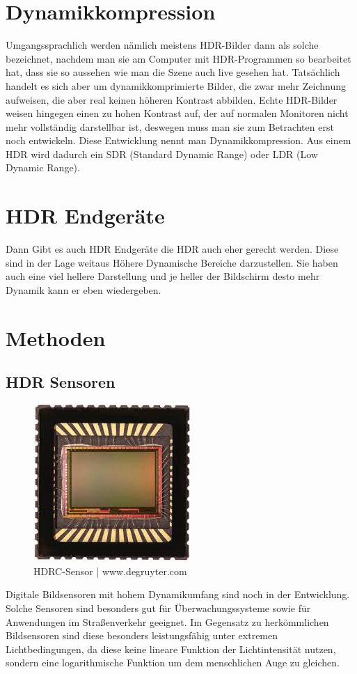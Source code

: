 \documentclass[11pt, a4paper, twocolumn]{article}
\begin{document}
	\section{Dynamikkompression}
	Umgangssprachlich werden nämlich meistens HDR-Bilder dann als solche bezeichnet, nachdem man sie am Computer mit HDR-Programmen so bearbeitet hat, dass sie so aussehen wie man die Szene auch live gesehen hat. Tatsächlich handelt es sich aber um dynamikkomprimierte Bilder, die zwar mehr Zeichnung aufweisen, die aber real keinen höheren Kontrast abbilden. Echte HDR-Bilder weisen hingegen einen zu hohen Kontrast auf, der auf normalen Monitoren nicht mehr vollständig darstellbar ist, deswegen muss man sie zum Betrachten erst noch entwickeln. Diese Entwicklung nennt man Dynamikkompression. Aus einem HDR wird dadurch ein SDR (Standard Dynamic Range) oder LDR (Low Dynamic Range). 
	\section{HDR Endgeräte}
	Dann Gibt es auch HDR Endgeräte die HDR auch eher gerecht werden. Diese sind in der Lage weitaus Höhere Dynamische Bereiche darzustellen. Sie haben auch eine viel hellere Darstellung und je heller der Bildschirm desto mehr Dynamik kann er eben wiedergeben.
	\section{Methoden}
	\subsection{HDR Sensoren}
		\begin{figure}[H]
			\centering
			\includegraphics[scale=0.5]{img/hdrcsensor.jpg}
			\caption{HDRC-Sensor | www.degruyter.com}
		\end{figure}
	Digitale Bildsensoren mit hohem Dynamikumfang sind noch in der Entwicklung. Solche Sensoren sind besonders gut für Überwachungssysteme sowie für Anwendungen im Straßenverkehr geeignet. Im Gegensatz zu herkömmlichen Bildsensoren sind diese besonders leistungsfähig unter extremen Lichtbedingungen, da diese keine lineare Funktion der Lichtintensität nutzen, sondern eine logarithmische Funktion um dem menschlichen Auge zu gleichen.
\end{document}
